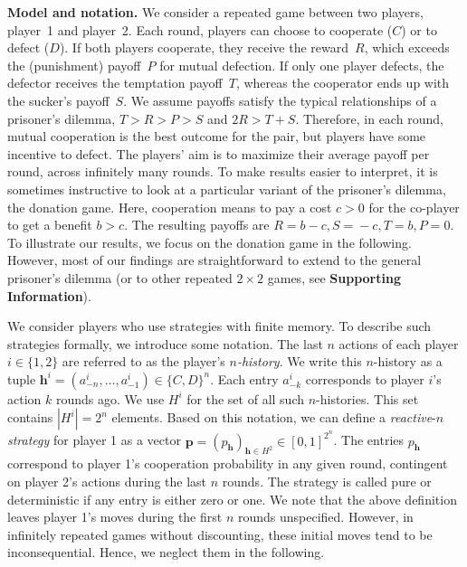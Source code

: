 \documentclass[11pt]{article}
\def\SI{\textbf{Supporting Information}}
\begin{document}

\textbf{Model and notation.}
We consider a repeated game between two players, player~1 and player~2.
Each round, players can choose to cooperate ($C$) or to defect ($D$). 
If both players cooperate, they receive the reward~$R$, which exceeds the (punishment) payoff~$P$ for mutual defection. 
If only one player defects, the defector receives the temptation payoff~$T$, whereas the cooperator ends up with the sucker's payoff~$S$. 
We assume payoffs satisfy the typical relationships of a prisoner's dilemma, $T \!>\! R \!>\! P \!>\! S$ and $2 R \!>\! T \!+\! S$. 
Therefore, in each round, mutual cooperation is the best outcome for the pair, but players have some incentive to defect. 
The players' aim is to maximize their average payoff per round, across infinitely many rounds.
To make results easier to interpret, it is sometimes instructive to look at a particular variant of the prisoner's dilemma, the donation game. 
Here, cooperation means to pay a cost $c\!>\!0$ for the co-player to get a benefit $b\!>\!c$.
The resulting payoffs are \(R \!\!=\! b\! -\! c, S \!=\! -c, T \!=\! b, P\!
=\! 0\). 
To illustrate our results, we focus on the donation game in the following. 
However, most of our findings are straightforward to extend to the general prisoner's dilemma (or to other repeated $2\!\times\!2$ games, see \SI). 

We consider players who use strategies with finite memory. 
To describe such strategies formally, we introduce some notation. 
The last $n$ actions of each player  $i\! \in\! \{1, 2\}$ are referred to as the player's {\it $n$-history}. 
We write this $n$-history as a tuple $\mathbf{h}^i\!=\!(a^i_{-n},\ldots,a^i_{-1})\!\in\!\{C,D\}^n$. 
Each entry $a^i_{-k}$ corresponds to player $i$'s action $k$ rounds ago. 
We use $H^i$ for the set of all such $n$-histories. 
This set contains $|H^i|\!=\!2^{n}$ elements. 
Based on this notation, we can define a {\it reactive}-$n$ {\it strategy} for player 1 as a vector $\mathbf{p}\!=\!(p_\mathbf{h})_{\mathbf{h}\in H^2} \!\in\! [0, 1]^{2^n}$. 
The entries $p_\mathbf{h}$ correspond to player 1's cooperation probability in any given round, contingent on player 2's actions during the last $n$ rounds. 
The strategy is called pure or deterministic if any entry is either zero or one. 
We note that the above definition leaves player 1's moves during the first $n$ rounds unspecified. 
However, in infinitely repeated games without discounting, these initial moves tend to be inconsequential. 
Hence, we neglect them in the following.
\end{document}
